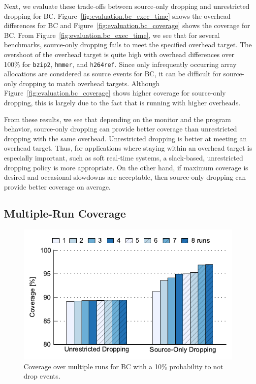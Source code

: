 Next, we evaluate these trade-offs between source-only dropping and unrestricted dropping for BC.
Figure~\ref{fig:evaluation.bc_exec_time} shows the overhead differences for BC
and Figure~\ref{fig:evaluation.bc_coverage} shows the coverage for BC.
From Figure~\ref{fig:evaluation.bc_exec_time}, we see that for several
benchmarks, source-only dropping fails to meet the specified overhead target.
The overshoot of the overhead target is quite high with overhead differences over 100\% for {\tt bzip2}, {\tt hmmer}, and {\tt h264ref}.
Since only infrequently occurring array allocations are considered as source events for BC, it can be 
difficult for source-only dropping to match overhead targets. Although
Figure~\ref{fig:evaluation.bc_coverage} shows higher coverage for
source-only dropping, this is largely due to the fact that is running with
higher overheads.

From these results, we see that depending on the monitor and the program
behavior, source-only dropping can provide better coverage than unrestricted
dropping with the same overhead. Unrestricted dropping is better at
meeting an overhead target.
Thus, for applications where staying within an overhead target is especially
important, such as soft real-time systems, a slack-based, unrestricted dropping
policy is more appropriate. On the other hand, if maximum coverage is desired
and occasional slowdowns are acceptable, then source-only dropping can provide
better coverage on average.

\subsection{Multiple-Run Coverage}

\begin{figure}
  \begin{center}
    \includegraphics[width=\columnwidth]{figs/data_multirun_coverage.pdf}
    \vspace{-0.3in}
    \caption{Coverage over multiple runs for BC with a 10\% probability to not drop events.}
    \label{fig:evaluation.multirun}
    \vspace{-0.3in}
  \end{center}
\end{figure}

